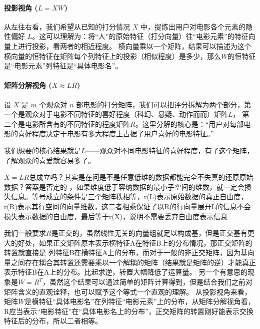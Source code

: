 \paragraph{投影视角 ($L = XW$)}
从左往右看，我们希望从已知的打分情况 $X$ 中，提炼出用户对电影各个元素的隐性偏好 $L$。这可以理解为：将“人”的原始特征（打分向量）往“电影元素”的特征向量上进行投影，看两者的相近程度。
横向量乘以一个矩阵，结果可以描述为这个横向量的恒特征在矩阵每个列特征上的投影（相似程度）是多少，那么$W$的恒特征是“电影元素”列特征是“具体电影名”。

\paragraph{矩阵分解视角 ($X \approx LR$)}
设 $X$ 是 $m$ 个观众对 $n$ 部电影的打分矩阵，我们可以把评分拆解为两个部分，第一个是观众对于电影不同特征的喜好程度（科幻、悬疑、动作而而）矩阵$L$，
第二个是电影所含有的不同特征的程度矩阵$R$。这里分解的核心是：“用户对每部电影的喜好程度决定于电影有多大程度上占据了用户喜好的电影特征。”

我们想要的核心结果就是$L$——观众对不同电影特征的喜好程度，有了这个矩阵，了解观众的喜爱就容易多了。

$X=LR$总成立吗？其实是在问是不是任意低维的数据都能完全不失真的还原原始数据？答案是否定的
，如果维度低于容纳数据的最小子空间的维数，就一定会损失信息。等号成立的条件是三个矩阵秩相等，r(L)表示原始数据的真正自由度，r(R)表示其行空间的向量维数，这二者相乘保证了以R的行向量展开L的信息不会损失表示数据的自由度，最后等于r(X)，说明不需要丢弃自由度表示信息

我们一般要求$R$是正交的，虽然线性无关的向量组就足以构成基，但是正交基有更大的好处，如果正交矩阵原本表示横特征A在特征B上的分布情况，那正交矩阵的转置就直接是
列特征B在横特征A上的分布，而对于一般的非正交矩阵，因为基向量之间存在耦合其转置还需要乘以一个解耦的矩阵（结果就是矩阵的逆）才能真正表示特征B在A上的分布。比起求逆，转置大幅降低了运算量。
另一个有意思的现象是$W = R^T$，虽然这个结果可以通过简单的矩阵计算得到，但是结合我们之前对矩阵含义的直观诠释，也可以赋予这个等式一个直观的理解。
从投影视角来看，矩阵$W$是横特征“具体电影名”在列特征“电影元素”上的分布，从矩阵分解视角看，R应当表示“电影特征”在“具体电影名上的分布”，正交矩阵的转置刚好能表示交换特征后的分布，所以二者相等。

